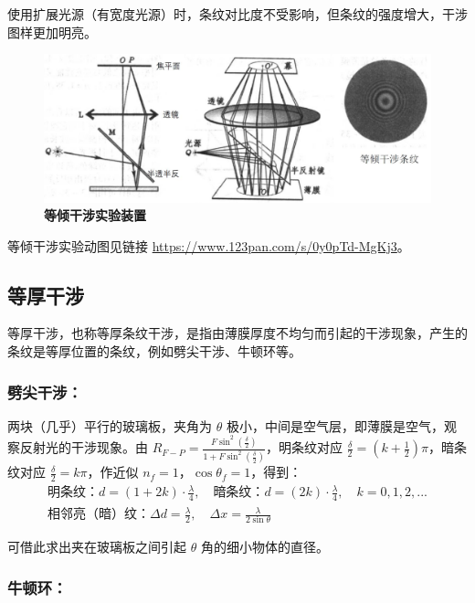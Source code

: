 \documentclass[UTF8]{report}
\theoremstyle{MyLineTheoremStyle} %
\theoremstyle{MyBlockTheoremStyle} %
\theoremstyle{MySubsubsectionStyle} %
\begin{document}
使用扩展光源（有宽度光源）时，条纹对比度不受影响，但条纹的强度增大，干涉图样更加明亮。

\begin{figure}[H]\centering
\includegraphics[width=0.7\columnwidth]{assets/3/等倾干涉.jpg}
\caption{\bfseries 等倾干涉实验装置}\label{等倾干涉实验装置}
\end{figure}

等倾干涉实验动图见链接 \href{https://www.123pan.com/s/0y0pTd-MgKj3}{https://www.123pan.com/s/0y0pTd-MgKj3}。

\subsection{等厚干涉} 

等厚干涉，也称等厚条纹干涉，是指由薄膜厚度不均匀而引起的干涉现象，产生的条纹是等厚位置的条纹，例如劈尖干涉、牛顿环等。

\subsubsection{劈尖干涉：}

两块（几乎）平行的玻璃板，夹角为 $\theta$ 极小，中间是空气层，即薄膜是空气，观察反射光的干涉现象。由 $R_{F-P} = \frac{ F \sin^2 (\frac{\delta}{2}) }{1 + F \sin^2 (\frac{\delta}{2})}$，明条纹对应 $\frac{\delta}{2} = (k + \frac{1}{2}) \pi$，暗条纹对应 $\frac{\delta}{2} = k \pi$，作近似 $n_f = 1$，$\cos \theta_f = 1$，得到：
\begin{gather}
    \text{明条纹：} d = \left( 1 + 2k \right)\cdot \frac{\lambda}{4},\quad \text{暗条纹：} d = \left( 2k \right)\cdot \frac{\lambda}{4},\quad k = 0, 1, 2, ... \\ 
    \text{相邻亮（暗）纹：}\Delta d = \frac{\lambda}{2},\quad \Delta x = \frac{\lambda}{2\sin \theta}
\end{gather}


可借此求出夹在玻璃板之间引起 $\theta$ 角的细小物体的直径。

\subsubsection{牛顿环：}
\end{document}
